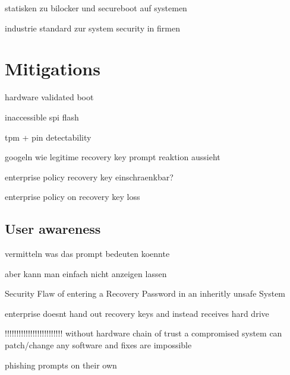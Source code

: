 statisken zu bilocker und secureboot auf systemen

industrie standard zur system security in firmen

\section{Mitigations}

hardware validated boot

inaccessible spi flash

tpm + pin detectability

googeln wie legitime recovery key prompt reaktion aussieht

enterprise policy recovery key einschraenkbar?

enterprise policy on recovery key loss


\subsection{User awareness}

vermitteln was das prompt bedeuten koennte

aber kann man einfach nicht anzeigen lassen

Security Flaw of entering a Recovery Password in an inheritly unsafe System

enterprise doesnt hand out recovery keys and instead receives hard drive


!!!!!!!!!!!!!!!!!!!!!!!!!
without hardware chain of trust a compromised system can patch/change any software and fixes are impossible

phishing prompts on their own
